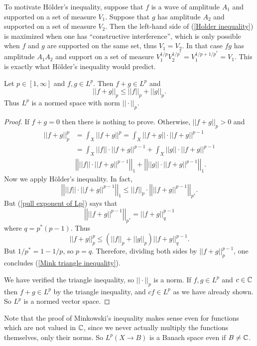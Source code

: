 To motivate H\"older's inequality, suppose that $f$ is a wave of amplitude $A_1$ and supported on a set of measure $V_1$.
Suppose that $g$ has amplitude $A_2$ and supported on a set of measure $V_2$.
Then the left-hand side of (\ref{Holder inequality}) is maximized when one has ``constructive interference'', which is only possible when $f$ and $g$ are supported on the same set, thus $V_1 = V_2$.
In that case $fg$ has amplitude $A_1A_2$ and support on a set of measure $V_1^{1/p}V_2^{1/p^*} = V_1^{1/p+1/p^*} = V_1$.
This is exactly what H\"older's inequality would predict.

\begin{theorem}
Let $p \in [1, \infty]$ and $f, g \in L^p$. Then $f + g \in L^p$ and
\begin{equation}\label{Mink triangle inequality}
||f + g||_{p}  \leq ||f||_{p}  + ||g||_{p} .
\end{equation}
Thus $L^p$ is a normed space with norm $||\cdot||_{p} $.
\end{theorem}
\begin{proof}
If $f + g = 0$ then there is nothing to prove.
Otherwise, $||f + g||_{p}  > 0$ and
\begin{align*}
||f + g||_{p} ^{p} &= \int_{X} ||f + g||^{p} = \int_{X} ||f + g||\cdot ||f + g||^{p-1} \\
&= \int_{X} ||f||\cdot ||f + g||^{p-1} + \int_{X} ||g||\cdot ||f + g||^{p-1}\\
&\left|\left|||f||\cdot ||f + g||^{p-1}\right|\right|_1 + \left|\left|||g||\cdot ||f + g||^{p-1}\right|\right|_1.
\end{align*}
Now we apply H\"older's inequality. In fact,
\[\left|\left|||f||\cdot ||f + g||^{p-1}\right|\right|_1 \leq ||f||_{p}  \cdot \left|\left|||f + g||^{p-1}\right|\right|_{p^*}.\]
But (\ref{pull exponent of Lp}) says that
\[\left|\left|||f + g||^{p-1}\right|\right|_{p^*} = ||f + g||_q^{p - 1}\]
where $q = p^*(p-1)$. Thus
\[||f + g||_{p} ^{p} \leq (||f||_{p}  + ||g||_{p} ) ||f + g||_q^{p - 1}.\]
But $1/p^* = 1 - 1/p$, so $p = q$. Therefore, dividing both sides by $||f + g||_{p} ^{p - 1}$, one concludes (\ref{Mink triangle inequality}).

We have verified the triangle inequality, so $||\cdot||_{p} $ is a norm. If $f, g \in L^p$ and $c \in \mathbb{C}$ then $f + g \in L^p$ by the triangle inequality, and $cf \in L^p$ as we have already shown.
So $L^p$ is a normed vector space.
\end{proof}
Note that the proof of Minkowski's inequality makes sense even for functions which are not valued in $\mathbb{C}$, since we never actually multiply the functions themselves, only their norms. So $L^p(X \to B)$ is a Banach space even if $B \neq \mathbb{C}$.

